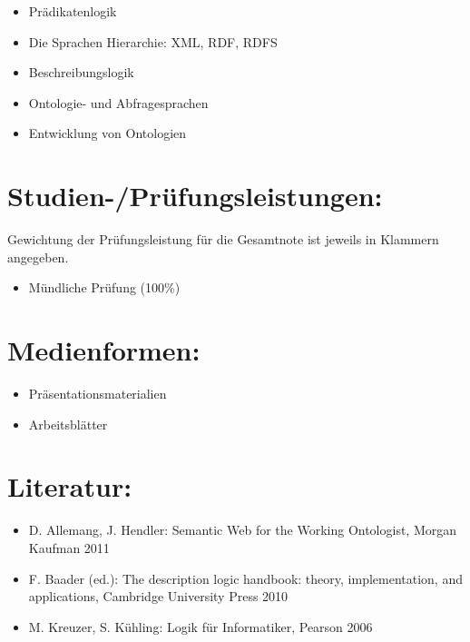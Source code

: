 \begin{itemize}
\tightlist
\item
  Prädikatenlogik
\item
  Die Sprachen Hierarchie: XML, RDF, RDFS
\item
  Beschreibungslogik
\item
  Ontologie- und Abfragesprachen
\item
  Entwicklung von Ontologien
\end{itemize}

\section*{Studien-/Prüfungsleistungen:\label{/mi-2017/modulbeschreibungen-master/MA_WTW_Modul_Logik-und-semantische-Modellierung}}\label{studien-pruxfcfungsleistungenpathlabelmi-2017modulbeschreibungen-mastermaux5fwtwux5fmodulux5flogik-und-semantische-modellierung}

Gewichtung der Prüfungsleistung für die Gesamtnote ist jeweils in
Klammern angegeben.

\begin{itemize}
\tightlist
\item
  Mündliche Prüfung (100\%)
\end{itemize}

\section*{Medienformen:\label{/mi-2017/modulbeschreibungen-master/MA_WTW_Modul_Logik-und-semantische-Modellierung}}\label{medienformenpathlabelmi-2017modulbeschreibungen-mastermaux5fwtwux5fmodulux5flogik-und-semantische-modellierung}

\begin{itemize}
\tightlist
\item
  Präsentationsmaterialien
\item
  Arbeitsblätter
\end{itemize}

\section*{Literatur:\label{/mi-2017/modulbeschreibungen-master/MA_WTW_Modul_Logik-und-semantische-Modellierung}}\label{literaturpathlabelmi-2017modulbeschreibungen-mastermaux5fwtwux5fmodulux5flogik-und-semantische-modellierung}

\begin{itemize}
\tightlist
\item
  D. Allemang, J. Hendler: Semantic Web for the Working Ontologist,
  Morgan Kaufman 2011
\item
  F. Baader (ed.): The description logic handbook: theory,
  implementation, and applications, Cambridge University Press 2010
\item
  M. Kreuzer, S. Kühling: Logik für Informatiker, Pearson 2006
\end{itemize}

